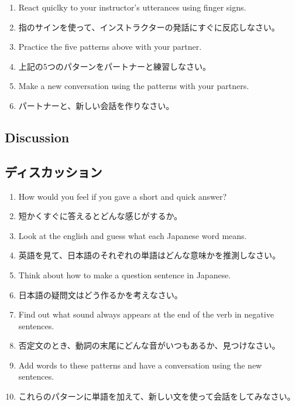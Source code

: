 \documentclass[uplatex,dvipdfmx,b5paper,english,10pt]{jsbook}
\begin{document}
\begin{enumerate}
\ifEnglish
  \item React quiclky to your instructor's utterances using finger signs.
\else
  \item 指のサインを使って、インストラクターの発話にすぐに反応しなさい。
\fi
\ifEnglish
  \item Practice the five patterns above with your partner.
\else
  \item 上記の5つのパターンをパートナーと練習しなさい。
\fi
\ifEnglish
  \item Make a new conversation using the patterns with your partners.
\else
  \item パートナーと、新しい会話を作りなさい。
\fi
\end{enumerate}

\ifEnglish
\subsection{Discussion}
\else
\subsection{ディスカッション}
\fi

\begin{enumerate}
\ifEnglish
 \item How would you feel if you gave a short and quick answer?
\else
 \item 短かくすぐに答えるとどんな感じがするか。
\fi
\ifEnglish
 \item Look at the english and guess what each Japanese word means.
\else
 \item 英語を見て、日本語のそれぞれの単語はどんな意味かを推測しなさい。
\fi
\ifEnglish
 \item Think about how to make a question sentence in Japanese.
\else
 \item 日本語の疑問文はどう作るかを考えなさい。
\fi
\ifEnglish
 \item Find out what sound always appears at the end of the verb in negative sentences.
\else
 \item 否定文のとき、動詞の末尾にどんな音がいつもあるか、見つけなさい。
\fi
\ifEnglish
 \item Add words to these patterns and have a conversation using the new sentences.
\else
 \item これらのパターンに単語を加えて、新しい文を使って会話をしてみなさい。
\fi
\end{enumerate}
\end{document}
